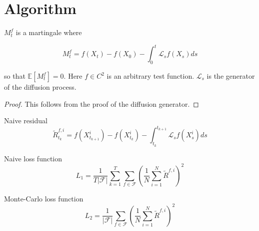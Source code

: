 \documentclass{beamer}
\begin{document}
\section{Algorithm}

\begin{frame}
\begin{theorem}
$M_t^f$ is a martingale where

\begin{equation}
	\label{eq:mart}
	M_t^f = f(X_t) - f(X_0) - \int_0^t \mathcal{L}_s f(X_s) ds 
\end{equation}

so that $\mathbb{E}[M_t^f] = 0$. Here $f \in C^2$ is an arbitrary test function. $\mathcal{L}_s$ is the generator of the diffusion process.
\label{thm:mart}
\end{theorem}

\begin{proof}
	This follows from the proof of the diffusion generator.
\end{proof}
\end{frame}

\begin{frame}
	\begin{block}{Naive residual}
\begin{equation*}
	\tilde R_{t_k}^{f,i} = f(X_{t_{k+1}}^i) - f(X_{t_k}^i) - \int_{t_k}^{t_{k+1}}\mathcal{L}_sf(X_s^i)ds
\end{equation*}
\end{block}

\begin{block}{Naive loss function}
\begin{equation}
	\label{naive_loss}
	L_1 = \frac{1}{T|\mathcal{F}|} \sum_{k=1}^{T} \sum_{f \in \mathcal{F}} \left(\frac{1}{N}\sum_{i=1}^{N} \tilde R^{f, i}\right)^2
\end{equation}
\end{block}
\end{frame}

\begin{frame}
\begin{block}{Monte-Carlo loss function}
\begin{equation}
	\label{bad_loss}
	L_2 = \frac{1}{|\mathcal{F}|} \sum_{f \in \mathcal{F}} \left(\frac{1}{N}\sum_{i=1}^{N} \tilde R^{f, i}\right)^2
\end{equation}
\end{block}
\end{frame}
\end{document}
